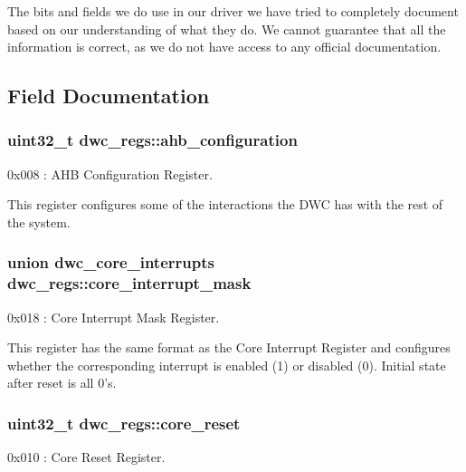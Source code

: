 The bits and fields we do use in our driver we have tried to completely document based on our understanding of what they do. We cannot guarantee that all the information is correct, as we do not have access to any official documentation. 

\subsection{Field Documentation}
\hypertarget{structdwc__regs_ad74731204d34ff5599e0f29b9e93722b}{
\subsubsection[{ahb\-\_\-configuration}]{\setlength{\rightskip}{0pt plus 5cm}uint32\-\_\-t dwc\-\_\-regs\-::ahb\-\_\-configuration}}\label{structdwc__regs_ad74731204d34ff5599e0f29b9e93722b}
0x008 \-: A\-H\-B Configuration Register.

This register configures some of the interactions the D\-W\-C has with the rest of the system. \hypertarget{structdwc__regs_a780c81354a4696a5676f906de7490163}{
\subsubsection[{core\-\_\-interrupt\-\_\-mask}]{\setlength{\rightskip}{0pt plus 5cm}union {\bf dwc\-\_\-core\-\_\-interrupts} dwc\-\_\-regs\-::core\-\_\-interrupt\-\_\-mask}}\label{structdwc__regs_a780c81354a4696a5676f906de7490163}
0x018 \-: Core Interrupt Mask Register.

This register has the same format as the Core Interrupt Register and configures whether the corresponding interrupt is enabled (1) or disabled (0). Initial state after reset is all 0's. \hypertarget{structdwc__regs_abe0dd3634e82145f915c93f43e4e1c5a}{
\subsubsection[{core\-\_\-reset}]{\setlength{\rightskip}{0pt plus 5cm}uint32\-\_\-t dwc\-\_\-regs\-::core\-\_\-reset}}\label{structdwc__regs_abe0dd3634e82145f915c93f43e4e1c5a}
0x010 \-: Core Reset Register.

